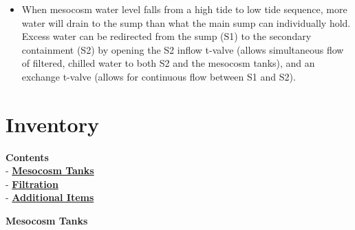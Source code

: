 \documentclass[
]{book}
\providecommand{\tightlist}{%
  \setlength{\itemsep}{0pt}\setlength{\parskip}{0pt}}
\begin{document}
\begin{itemize}
  \begin{itemize}
  \tightlist
  \item
    When mesocosm water level falls from a high tide to low tide sequence, more water will drain to the sump than what the main sump can individually hold. Excess water can be redirected from the sump (S1) to the secondary containment (S2) by opening the S2 inflow t-valve (allows simultaneous flow of filtered, chilled water to both S2 and the mesocosm tanks), and an exchange t-valve (allows for continuous flow between S1 and S2).
  \end{itemize}
\end{itemize}

\hypertarget{inventory}{%
\chapter{Inventory}\label{inventory}}

\textbf{Contents}\\
- \protect\hyperlink{Mesocosm_Tanks}{\textbf{Mesocosm Tanks}}\\
- \protect\hyperlink{Filtration}{\textbf{Filtration}}\\
- \protect\hyperlink{Additional_Items}{\textbf{Additional Items}}

\textbf{Mesocosm Tanks}
\end{document}
